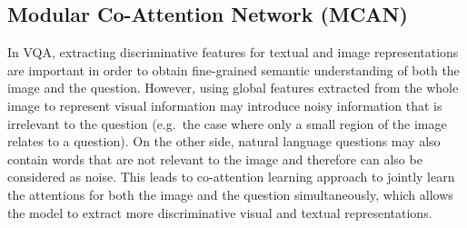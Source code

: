 \documentclass{article}
\begin{document}
\subsection{Modular Co-Attention Network (MCAN)} \label{subsection:mcan}
In VQA, extracting discriminative features for textual and image representations are important in order to obtain fine-grained semantic understanding of both the image and the question. However, using global features extracted from the whole image to represent visual information may introduce noisy information that is irrelevant to the question (e.g.\ the case where only a small region of the image relates to a question). On the other side, natural language questions may also contain words that are not relevant to the image and therefore can also be considered as noise. 
This leads to co-attention learning approach to jointly learn the attentions for both the image and the question simultaneously, which allows the model to extract more discriminative visual and textual representations. 

\end{document}
